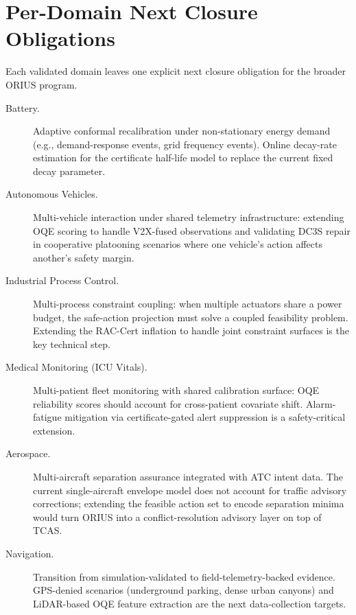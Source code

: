 \section{Per-Domain Next Closure Obligations}

Each validated domain leaves one explicit next closure obligation for the
broader ORIUS program.

\begin{description}
  \item[Battery.] Adaptive conformal recalibration under non-stationary
    energy demand (e.g., demand-response events, grid frequency events).
    Online decay-rate estimation for the certificate half-life model to
    replace the current fixed decay parameter.

  \item[Autonomous Vehicles.] Multi-vehicle interaction under shared
    telemetry infrastructure: extending OQE scoring to handle V2X-fused
    observations and validating DC3S repair in cooperative platooning
    scenarios where one vehicle's action affects another's safety margin.

  \item[Industrial Process Control.] Multi-process constraint coupling:
    when multiple actuators share a power budget, the safe-action projection
    must solve a coupled feasibility problem.  Extending the RAC-Cert
    inflation to handle joint constraint surfaces is the key technical step.

  \item[Medical Monitoring (ICU Vitals).] Multi-patient fleet monitoring
    with shared calibration surface: OQE reliability scores should account
    for cross-patient covariate shift.  Alarm-fatigue mitigation via
    certificate-gated alert suppression is a safety-critical extension.

  \item[Aerospace.] Multi-aircraft separation assurance integrated with
    ATC intent data.  The current single-aircraft envelope model does not
    account for traffic advisory corrections; extending the feasible action
    set to encode separation minima would turn ORIUS into a conflict-resolution
    advisory layer on top of TCAS.

  \item[Navigation.] Transition from simulation-validated to
    field-telemetry-backed evidence.  GPS-denied scenarios (underground
    parking, dense urban canyons) and LiDAR-based OQE feature extraction
    are the next data-collection targets.
\end{description}

